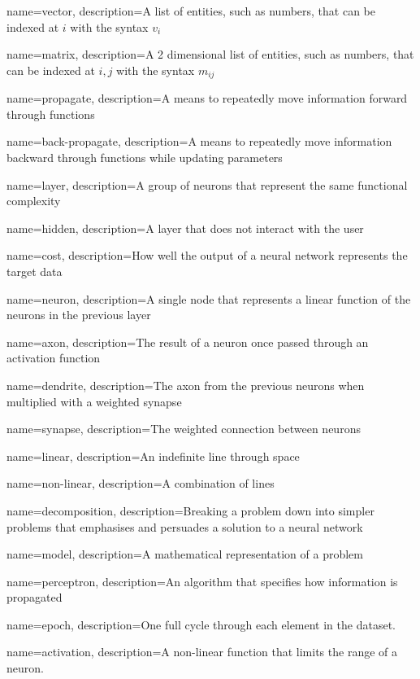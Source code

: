 {
    name=vector,
    description={A list of entities, such as numbers, that can be indexed at $i$ with the syntax $v_i$}
}

{
    name=matrix,
    description={A 2 dimensional list of entities, such as numbers, that can be indexed at $i,j$ with the syntax $m_{ij}$}
}

{
    name=propagate,
    description={A means to repeatedly move information forward through functions}
}

{
    name=back-propagate,
    description={A means to repeatedly move information backward through functions while updating parameters}
}

{
    name=layer,
    description={A group of neurons that represent the same functional complexity}
}

{
    name=hidden,
    description={A layer that does not interact with the user}
}

{
    name=cost,
    description={How well the output of a neural network represents the target data}
}

{
    name=neuron,
    description={A single node that represents a linear function of the neurons in the previous layer}
}

{
    name=axon,
    description={The result of a neuron once passed through an activation function}
}

{
    name=dendrite,
    description={The axon from the previous neurons when multiplied with a weighted synapse}
}

{
    name=synapse,
    description={The weighted connection between neurons}
}

{
    name=linear,
    description={An indefinite line through space}
}

{
    name=non-linear,
    description={A combination of lines}
}

{
    name=decomposition,
    description={Breaking a problem down into simpler problems that emphasises and persuades a solution to a neural network}
}

{
    name=model,
    description={A mathematical representation of a problem}
}

{
    name=perceptron,
    description={An algorithm that specifies how information is propagated}
}

{
    name=epoch,
    description={One full cycle through each element in the dataset.}
}

{
    name=activation,
    description={A non-linear function that limits the range of a neuron.}
}

